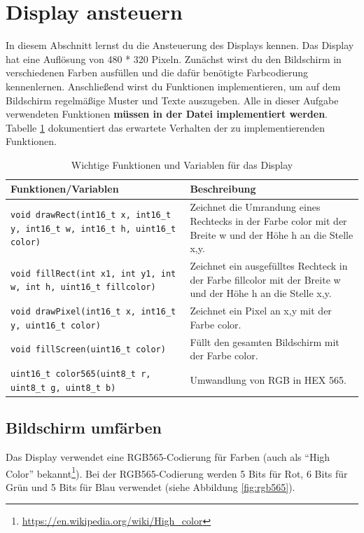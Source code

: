 \section{\ExercisePrefixEmbeddedC Display ansteuern \optional}
In diesem Abschnitt lernst du die Ansteuerung des Displays kennen.
Das Display hat eine Auflösung von 480 * 320 Pixeln.
Zunächst wirst du den Bildschirm in verschiedenen Farben ausfüllen und die dafür benötigte Farbcodierung kennenlernen.
Anschließend wirst du Funktionen implementieren, um auf dem Bildschirm regelmäßige Muster und Texte auszugeben.
Alle in dieser Aufgabe verwendeten Funktionen \textbf{müssen in der Datei  implementiert werden}. 
Tabelle \ref{tab:displayFunctions} dokumentiert das erwartete Verhalten der zu implementierenden Funktionen.
%
\begin{table}
	\centering
	\caption{Wichtige Funktionen und Variablen für das Display}
	\label{tab:displayFunctions}
	\begin{tabular}{p{7cm}p{7cm}}
        \toprule
		\textbf{Funktionen/Variablen} & \textbf{Beschreibung} \\
        \midrule
        \lstinline|void drawRect(int16_t x, int16_t y, int16_t w, int16_t h, uint16_t color)|
        & Zeichnet die Umrandung eines Rechtecks in der Farbe color mit der Breite w und der Höhe h an die Stelle x,y. \\ \hline
		\lstinline|void fillRect(int x1, int y1, int w, int h, uint16_t fillcolor)|
        & Zeichnet ein ausgefülltes Rechteck in der Farbe fillcolor mit der Breite w und der Höhe h an die Stelle x,y. \\ \hline
		\lstinline|void drawPixel(int16_t x, int16_t y, uint16_t color)|
        & Zeichnet ein Pixel an x,y mit der Farbe color. \\ \hline
		\lstinline|void fillScreen(uint16_t color)| 
        & Füllt den gesamten Bildschirm mit der Farbe color. \\ \hline
		\lstinline|uint16_t color565(uint8_t r, uint8_t g, uint8_t b)|
        & Umwandlung von RGB in HEX 565. \\
        \bottomrule
	\end{tabular}
\end{table}

\subsection{Bildschirm umfärben}
Das Display verwendet eine RGB565-Codierung für Farben (auch als \enquote{High Color} bekannt\footnote{\url{https://en.wikipedia.org/wiki/High_color}}).
Bei der RGB565-Codierung werden 5 Bits für Rot, 6 Bits für Grün und 5 Bits für Blau verwendet (siehe Abbildung \ref{fig:rgb565}).

